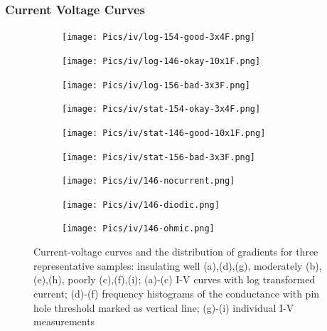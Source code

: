 \subsubsection{Current Voltage Curves} 
\begin{figure}
    \centering
    \begin{subfigure}{.3\textwidth}
        \texttt{[image: Pics/iv/log-154-good-3x4F.png]}
		\caption{}%
		\label{fig:iv-log-good}
    \end{subfigure}
    \begin{subfigure}{.3\textwidth}
        \texttt{[image: Pics/iv/log-146-okay-10x1F.png]}
		\caption{}%
		\label{fig:iv-log-okay}
    \end{subfigure}
    \begin{subfigure}{.3\textwidth}
        \texttt{[image: Pics/iv/log-156-bad-3x3F.png]}
		\caption{}%
		\label{fig:iv-log-bad}
    \end{subfigure}
    \begin{subfigure}{.3\textwidth}
        \texttt{[image: Pics/iv/stat-154-okay-3x4F.png]}
		\caption{}%
		\label{fig:iv-stat-good}
    \end{subfigure}
    \begin{subfigure}{.3\textwidth}
        \texttt{[image: Pics/iv/stat-146-good-10x1F.png]}
		\caption{}%
		\label{fig:iv-stat-okay}
    \end{subfigure}
    \begin{subfigure}{.3\textwidth}
        \texttt{[image: Pics/iv/stat-156-bad-3x3F.png]}
		\caption{}%
		\label{fig:iv-stat-bad}
    \end{subfigure}
    \begin{subfigure}{.3\textwidth}
        \texttt{[image: Pics/iv/146-nocurrent.png]}
		\caption{}%
		\label{fig:iv-nocurrent}
    \end{subfigure}
    \begin{subfigure}{.3\textwidth}
        \texttt{[image: Pics/iv/146-diodic.png]}
		\caption{}%
		\label{fig:iv-diodic}
    \end{subfigure}
    \begin{subfigure}{.3\textwidth}
        \texttt{[image: Pics/iv/146-ohmic.png]}
		\caption{}%
		\label{fig:iv-ohmic}
    \end{subfigure}
	\caption{
		Current-voltage curves and the distribution of gradients for three representative samples: insulating well (a),(d),(g), moderately (b),(e),(h), poorly (c),(f),(i); 
		(a)-(c) I-V curves with log transformed current; 
		(d)-(f) frequency histograms of the conductance with pin hole threshold marked as vertical line; 
		(g)-(i) individual I-V measurements
	}
    \label{fig:iv}
\end{figure}

